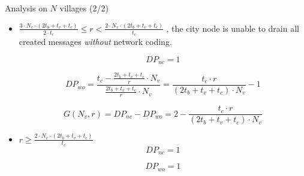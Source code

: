 \documentclass[compress]{beamer}
\newcommand\Fontvi{\fontsize{6}{7.2}\selectfont}
\begin{document}
\begin{frame}{Analysis on $N$ villages (2/2)}
	\Fontvi
	\begin{itemize}
		
		\item $\frac{3 \cdot N_v \cdot (2t_b + t_v + t_c)}{2 \cdot t_c} \le r < \frac{2\cdot N_v \cdot (2t_b + t_v + t_c)}{t_c}$
		      , the city node is unable to drain all created messages \emph{without} network coding.
		      
		      \begin{equation}
		      	DP_{nc} = 1
		      \end{equation}
		      
		      \begin{equation}
		      	DP_{wo} 
		      	= \frac{t_c - \frac{2t_b + t_v + t_c}{r} \cdot N_v}{\frac{2t_b + t_v + t_c}{r} \cdot N_v}  
		      	= \frac{t_c \cdot r}{(2t_b + t_v + t_c) \cdot N_v} - 1
		      \end{equation}
		      
		      \begin{equation}
		      	G(N_v, r) = DP_{nc} - DP_{wo} = 2 - \frac{t_c \cdot r}{(2t_b + t_v + t_c) \cdot N_v}
		      \end{equation}
		      
		\item $r \ge \frac{2\cdot N_v \cdot (2t_b + t_v + t_c)}{t_c}$
		      \begin{equation}
		      	DP_{nc} = 1
		      \end{equation}
		      
		      \begin{equation}
		      	DP_{wo} = 1
		      \end{equation}
		      
	\end{itemize}
\end{frame}
\end{document}
